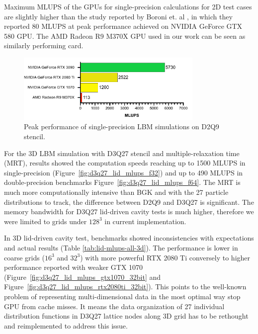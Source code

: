 Maximum MLUPS of the GPUs for single-precision calculations for 2D test cases are slightly higher than the study reported by Boroni et. al \citep{boroniFULLGPUImplementation2017}, in which they reported 80 MLUPS at peak performance achieved on NVIDIA GeForce GTX 580 GPU. The AMD Radeon R9 M370X GPU used in our work can be seen as similarly performing card. 

\begin{figure}[!ht]
	\centering
	\includegraphics[width=0.8\textwidth]{data/max_mlups_2d.pdf}
	\caption{Peak performance of single-precision LBM simulations on D2Q9 stencil.}
	\label{fig:max_mlups}
\end{figure}

For the 3D LBM simulation with D3Q27 stencil and multiple-relaxation time (MRT), results showed the computation speeds reaching up to 1500 MLUPS in single-precision (Figure~\ref{fig:d3q27_lid_mlups_f32}) and up to 490 MLUPS in double-precision benchmarks Figure~\ref{fig:d3q27_lid_mlups_f64}. The MRT is much more computationally intensive than BGK and with the 27 particle distributions to track, the difference between D2Q9 and D3Q27 is significant. The memory bandwidth for D3Q27 lid-driven cavity tests is much higher, therefore we were limited to grids under $128^3$ in current implementation.

In 3D lid-driven cavity test, benchmarks showed inconsistencies with expectations and actual results (Table \ref{tab:lid-mlups-all-3d}). The performance is lower in coarse grids ($16^3$ and $32^3$) with more powerful RTX 2080 Ti conversely to higher performance reported with weaker GTX 1070 (Figure~\ref{fig:d3q27_lid_mlups_gtx1070_32bit} and Figure~\ref{fig:d3q27_lid_mlups_rtx2080ti_32bit}). This points to the well-known problem of representing multi-dimensional data in the most optimal way stop GPU from cache misses. It means the data organization of 27 individual distribution functions in D3Q27 lattice nodes along 3D grid has to be rethought and reimplemented to address this issue.  


